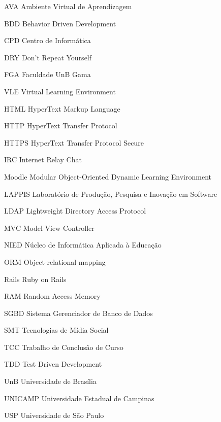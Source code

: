 \begin{siglas}
  \item[AVA] Ambiente Virtual de Aprendizagem
  \item[BDD] Behavior Driven Development
  \item[CPD] Centro de Informática
  \item[DRY] Don’t Repeat Yourself
  \item[FGA] Faculdade UnB Gama
  \item[VLE] Virtual Learning Environment
  \item[HTML] HyperText Markup Language
  \item[HTTP] HyperText Transfer Protocol
  \item[HTTPS] HyperText Transfer Protocol Secure
  \item[IRC] Internet Relay Chat
  \item[Moodle] Modular Object-Oriented Dynamic Learning Environment
  \item[LAPPIS] Laboratório de Produção, Pesquisa e Inovação em Software
  \item[LDAP] Lightweight Directory Access Protocol
  \item[MVC] Model-View-Controller
  \item[NIED] Núcleo de Informática Aplicada à Educação
  \item[ORM] Object-relational mapping
  \item[Rails] Ruby on Rails
  \item[RAM] Random Access Memory
  \item[SGBD] Sistema Gerenciador de Banco de Dados
  \item[SMT] Tecnologias de Mídia Social
  \item[TCC] Trabalho de Conclusão de Curso
  \item[TDD] Test Driven Development
  \item[UnB] Universidade de Brasília
  \item[UNICAMP] Universidade Estadual de Campinas
  \item[USP] Universidade de São Paulo
\end{siglas}
